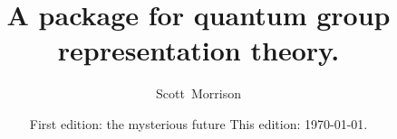 \title{A \MMA package for quantum group representation theory.}

\author{Scott~Morrison}
\address{
}
\email{}
\urladdr{}

\date{
  First edition: the mysterious future
  This edition: \today.
}

\primaryclass{} \secondaryclass{}
\keywords{
}
